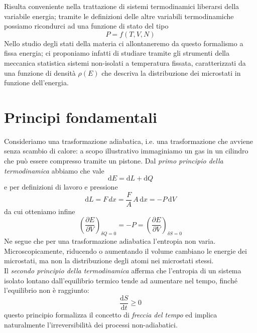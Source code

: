 \documentclass[a4paper]{report}
\begin{document}
Risulta conveniente nella trattazione di sistemi termodinamici liberarsi della variabile energia; tramite le definizioni delle altre variabili termodinamiche possiamo ricondurci ad una funzione di stato del tipo
\begin{equation}
    P = f(T,V,N)
\end{equation}
Nello studio degli stati della materia ci allontaneremo da questo formalismo a fissa energia; ci proponiamo infatti di studiare tramite gli strumenti della meccanica statistica sistemi non-isolati a temperatura fissata, caratterizzati da una funzione di densità $\rho(E)$ che descriva la distribuzione dei microstati in funzione dell'energia.

\section{Principi fondamentali}

Consideriamo una trasformazione adiabatica, i.e. una trasformazione che avviene senza scambio di calore: a scopo illustrativo immaginiamo un gas in un cilindro che può essere compresso tramite un pistone. Dal \textit{primo principio della termodinamica} abbiamo che vale
\begin{equation}
    \mathrm{d}E = \mathrm{d}L + \mathrm{d}Q
\end{equation}
e per definizioni di lavoro e pressione
\begin{equation}
    \mathrm{d}L = F\mathrm\,{d}x = \frac{F}{A}\,A\,\mathrm{d}x = -P\, \mathrm{d}V
\end{equation}
da cui otteniamo infine
\begin{equation}
    \left(\frac{\partial E}{\partial V}\right)_{\delta Q = 0} = -P = \left(\frac{\partial E}{\partial V}\right)_{\delta S = 0}
\end{equation}
Ne segue che per una trasformazione adiabatica l'entropia non varia. Microscopicamente, riducendo o aumentando il volume cambiano le energie dei microstati, ma non la distribuzione degli atomi nei microstati stessi.\\

Il \textit{secondo principio della termodinamica} afferma che l'entropia di un sistema isolato lontano dall'equilibrio termico tende ad aumentare nel tempo, finché l'equilibrio non è raggiunto:
\begin{equation}
    \frac{\mathrm{d}S}{\mathrm{d}t} \geq 0
\end{equation}
questo principio formalizza il concetto di \textit{freccia del tempo} ed implica naturalmente l'irreversibilità dei processi non-adiabatici. \\
\end{document}
